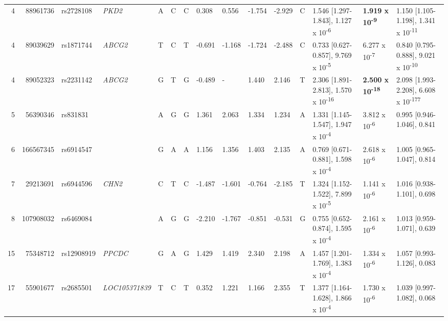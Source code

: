 \documentclass[twoside,openright]{report}
\begin{document}
\begin{landscape}
\begin{table}
{\begin{tabular}[t]{rrlllllllllllll}
\hspace{1em}4 & 88961736 & rs2728108 & \em{PKD2} & A & C & C & 0.308 & 0.556 & -1.754 & -2.929 & C & 1.546 [1.297-1.843], 1.127 x 10\textsuperscript{-6} & \textbf{1.919 x 10\textsuperscript{-9}} & 1.150 [1.105-1.198], 1.341 x 10\textsuperscript{-11}\\
\hspace{1em}4 & 89039629 & rs1871744 & \em{ABCG2} & T & C & T & -0.691 & -1.168 & -1.724 & -2.488 & C & 0.733 [0.627-0.857], 9.769 x 10\textsuperscript{-5} & 6.277 x 10\textsuperscript{-7} & 0.840 [0.795-0.888], 9.021 x 10\textsuperscript{-10}\\
\hspace{1em}4 & 89052323 & rs2231142 & \em{ABCG2} & G & T & G & -0.489 & - & 1.440 & 2.146 & T & 2.306 [1.891-2.813], 1.570 x 10\textsuperscript{-16} & \textbf{2.500 x 10\textsuperscript{-18}} & 2.098 [1.993-2.208], 6.608 x 10\textsuperscript{-177}\\
\hspace{1em}5 & 56390346 & rs831831 & \em{} & A & G & G & 1.361 & 2.063 & 1.334 & 1.234 & A & 1.331 [1.145-1.547], 1.947 x 10\textsuperscript{-4} & 3.812 x 10\textsuperscript{-6} & 0.995 [0.946-1.046], 0.841\\
\hspace{1em}6 & 166567345 & rs6914547 & \em{} & G & A & A & 1.156 & 1.356 & 1.403 & 2.135 & A & 0.769 [0.671-0.881], 1.598 x 10\textsuperscript{-4} & 2.618 x 10\textsuperscript{-6} & 1.005 [0.965-1.047], 0.814\\
\hspace{1em}7 & 29213691 & rs6944596 & \em{CHN2} & C & T & C & -1.487 & -1.601 & -0.764 & -2.185 & T & 1.324 [1.152-1.522], 7.899 x 10\textsuperscript{-5} & 1.141 x 10\textsuperscript{-6} & 1.016 [0.938-1.101], 0.698\\
\hspace{1em}8 & 107908032 & rs6469084 & \em{} & A & G & G & -2.210 & -1.767 & -0.851 & -0.531 & G & 0.755 [0.652-0.874], 1.595 x 10\textsuperscript{-4} & 2.161 x 10\textsuperscript{-6} & 1.013 [0.959-1.071], 0.639\\
\hspace{1em}15 & 75348712 & rs12908919 & \em{PPCDC} & G & A & G & 1.429 & 1.419 & 2.340 & 2.198 & A & 1.457 [1.201-1.769], 1.383 x 10\textsuperscript{-4} & 1.334 x 10\textsuperscript{-6} & 1.057 [0.993-1.126], 0.083\\
\hspace{1em}17 & 55901677 & rs2685501 & \em{LOC105371839} & T & C & T & 0.352 & 1.221 & 1.166 & 2.355 & T & 1.377 [1.164-1.628], 1.866 x 10\textsuperscript{-4} & 1.730 x 10\textsuperscript{-6} & 1.039 [0.997-1.082], 0.068\\

\end{tabular}}
\end{table}
\end{landscape}
\end{document}

